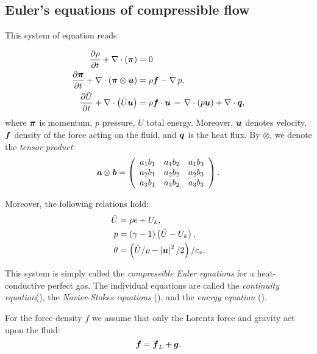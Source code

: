 \subsection{Euler's equations of compressible flow}
\label{subsec:euler}
This system of equation reads

\begin{align}
\label{ContinuityEq} \frac{\partial{\rho}}{\partial{t}} + \nabla\cdot\left(\mbox{\boldmath $\pi$}\right) & =  0\\
\label{NSEq} \frac{\partial{\mbox{\boldmath $\pi$}}}{\partial{t}} + \nabla\cdot\left(\mbox{\boldmath $\pi$}\otimes\mbox{\boldmath $u$}\right)& =  \rho\mbox{\boldmath $f$} - \nabla\,p,\\
\label{EnergyEq} \frac{\partial{\tilde{U}}}{\partial{t}} + \nabla\cdot\left({\tilde{U}}\mbox{\boldmath $u$}\right) & =  \rho\mbox{\boldmath $f$}\cdot\mbox{\boldmath $u$} \,-\,\nabla\cdot\left({p}\mbox{\boldmath $u$}\right) + \nabla\cdot\mbox{\boldmath $q$},
\end{align}
where $\mbox{\boldmath $\pi$}$ is momentum, $p$ pressure, $U$ total energy. Moreover, $\mbox{\boldmath $u$}$ denotes velocity, $\mbox{\boldmath $f$}$ density of the force acting on the fluid, and $\mbox{\boldmath $q$}$ is the heat flux. By $\otimes$, we denote the \textit{tensor product}:
\begin{displaymath}
\textit{\textbf{a}}\otimes\textit{\textbf{b}} =
\left(
\begin{array}{ccc}
a_1b_1 & a_1b_2 & a_1b_3 \\
a_2b_1 & a_2b_2 & a_2b_3 \\
a_3b_1 & a_3b_2 & a_3b_3
\end{array}
\right).
\end{displaymath}

Moreover, the following relations hold:
\begin{align}
\tilde{U} & =  \rho e + U_k,\\
p & =  \left({}\gamma-1\right)\left({\tilde{U}}-U_k\right), \label{therm_1}\\
\theta & =  \left({\tilde{U}}/{\rho}-\left|\mbox{\boldmath $u$}\right|^2/2\right)/{c_v}.
\end{align}

This system is simply called the \textit{compressible Euler equations} for a heat-conductive perfect gas. The individual equations are called the \textit{continuity equation}(), the \textit{Navier-Stokes equations} (), and the \textit{energy equation} ().

For the force density $f$ we assume that only the Lorentz force and gravity act upon the fluid:
$$
\label{ForceEq} \mbox{\boldmath $f$} = \mbox{\boldmath $f$}_L + \mbox{\boldmath $g$}.
$$


